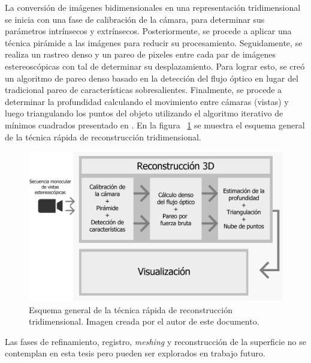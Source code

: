 La conversi\'{o}n de im\'{a}genes bidimensionales en una representaci\'{o}n tridimensional se inicia con una fase de calibraci\'{o}n de la c\'{a}mara, para determinar sus par\'{a}metros intr\'{i}nsecos y extr\'{i}nsecos. Posteriormente, se procede a aplicar una t\'{e}cnica pir\'{a}mide a las im\'{a}genes para reducir su procesamiento. Seguidamente, se realiza un rastreo denso y un pareo de pixeles entre cada par de im\'{a}genes estereosc\'{o}picas con tal de determinar su desplazamiento. Para lograr esto, se cre\'{o} un algoritmo de pareo denso basado en la detecci\'{o}n del flujo \'{o}ptico en lugar del tradicional pareo de caracter\'{i}sticas sobresalientes. Finalmente, se procede a determinar la profundidad calculando el movimiento entre c\'{a}maras (vistas) y luego triangulando los puntos del objeto utilizando el algoritmo iterativo de m\'{i}nimos cuadrados presentado en \cite{hartley1997triangulation}. En la figura ~\ref{fig:SystemOverview} se muestra el esquema general de la t\'{e}cnica r\'{a}pida de reconstrucci\'{o}n tridimensional.


\begin{figure}[H]
\centering
\includegraphics[width=1.0\textwidth]{images/systemoverview.png}
\caption[Esquema general de la t\'{e}cnica r\'{a}pida de reconstrucci\'{o}n tridimensional]%
{Esquema general de la t\'{e}cnica r\'{a}pida de reconstrucci\'{o}n tridimensional. Imagen creada por el autor de este documento.}
\label{fig:SystemOverview}
\end{figure}


Las fases de refinamiento, registro, \textit{meshing} y reconstrucci\'{o}n de la superficie no se contemplan en esta tesis pero pueden ser explorados en trabajo futuro.

